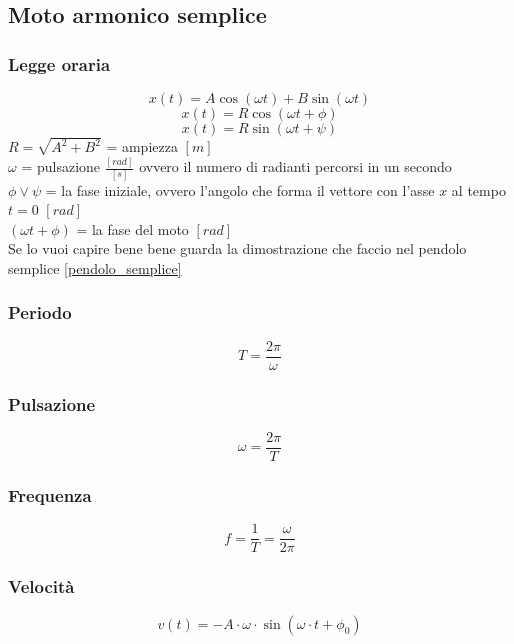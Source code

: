 \documentclass[twoside]{article}
\begin{document}
\subsection{Moto armonico semplice}
\subsubsection{Legge oraria}
\begin{equation}
  \boxed{x(t) = A\cos(\omega t) + B\sin(\omega t)}
\end{equation}
\begin{equation}
  \boxed{x(t) = R\cos(\omega t + \phi)}
\end{equation}
\begin{equation}
  \boxed{x(t) = R\sin(\omega t + \psi)}
\end{equation}
$R = \sqrt{A^2+B^2}$ = ampiezza $[m]$\\
$\omega$ = pulsazione $\frac{[rad]}{[s]}$ ovvero il numero di radianti percorsi in un secondo \\
$\phi \lor \psi$ = la fase iniziale, ovvero l'angolo che forma il vettore con l'asse $x$ al tempo $t = 0$ $[rad]$ \\
$(\omega t + \phi)$ = la fase del moto $[rad]$ \\
Se lo vuoi capire bene bene guarda la dimostrazione che faccio nel pendolo semplice \ref{pendolo_semplice}
\subsubsection{Periodo}
\begin{equation}
  \boxed{T = \frac{2 \pi}{\omega}}
\end{equation}
\subsubsection{Pulsazione}
\begin{equation}
  \boxed{\omega = \frac{2 \pi}{T}}
\end{equation}
\subsubsection{Frequenza}
\begin{equation}
  \boxed{f = \frac{1}{T} = \frac{\omega}{2 \pi}}
\end{equation}
\subsubsection{Velocità}
\begin{equation}
  \boxed{v(t) = -A \cdot \omega \cdot \sin{(\omega \cdot t + \phi_0)}}
\end{equation}
\end{document}
